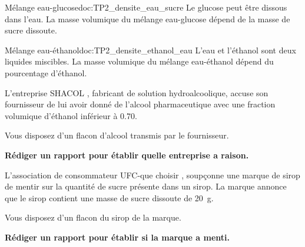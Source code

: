 \begin{multicols}{2}
  \begin{doc}{Mélange eau-glucose}{doc:TP2_densite_eau_sucre}
    Le glucose peut être dissous dans l'eau.
    La masse volumique du mélange eau-glucose dépend de la masse de sucre dissoute.
    \begin{center}
    \end{center}
  \end{doc}  
  
  \begin{doc}{Mélange eau-éthanol}{doc:TP2_densite_ethanol_eau}
    L'eau et l'éthanol sont deux liquides miscibles.
    La masse volumique du mélange eau-éthanol dépend du pourcentage d'éthanol.
    \begin{center}
    \end{center}
  \end{doc}
\end{multicols}


L'entreprise \og SHACOL \fg, fabricant de solution hydroalcoolique, accuse son fournisseur de lui avoir donné de l'alcool pharmaceutique avec une fraction volumique d'éthanol inférieur à \num{0,70}.

Vous disposez d'un flacon d'alcool transmis par le fournisseur.

\begin{center}
  \textbf{Rédiger un rapport pour établir quelle entreprise a raison.}
\end{center}



L'association de consommateur \og UFC-que choisir \fg, soupçonne une marque de sirop de mentir sur la quantité de sucre présente dans un sirop.
La marque annonce que le sirop contient une masse de sucre dissoute de \qty{20}{\g}.

Vous disposez d'un flacon du sirop de la marque.

\begin{center}
  \textbf{Rédiger un rapport pour établir si la marque a menti.}
\end{center}